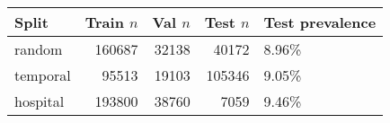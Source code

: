 \begin{tabular}{lrrrl}
\toprule
Split & Train $n$ & Val $n$ & Test $n$ & Test prevalence \\
\midrule
random & 160687 & 32138 & 40172 & 8.96\% \\
temporal & 95513 & 19103 & 105346 & 9.05\% \\
hospital & 193800 & 38760 & 7059 & 9.46\% \\
\bottomrule
\end{tabular}
